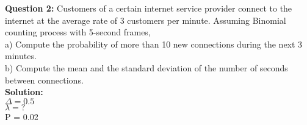 \documentclass[11pt, a4paper]{article}
\begin{document}
	
	
	
\vspace{5mm}
\textbf{Question 2:}	
Customers of a certain internet service provider connect to the internet at the
average rate of 3 customers per minute. Assuming Binomial counting process
with 5-second frames,\\
a) Compute the probability of more than 10 new connections during the next 3
minutes.\\
b) Compute the mean and the standard deviation of the number of seconds
between connections.	
\vspace*{5mm}	\\
\textbf{Solution: }	\\
$\Delta = 0.5$\\
$\lambda = ?	$\\
P = 0.02\\

	
\end{document}
